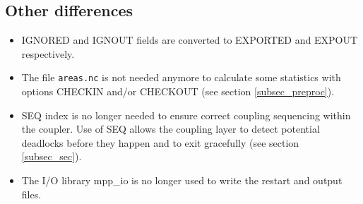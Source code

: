 \subsection{Other differences}
\label{sec_changes_other}

\begin{itemize}

\item IGNORED and IGNOUT fields are converted to EXPORTED and EXPOUT
  respectively.

\item The file {\tt areas.nc} is not needed anymore to calculate some
  statistics with options CHECKIN and/or CHECKOUT (see section \ref{subsec_preproc}).

\item SEQ index is no longer needed to ensure correct coupling
  sequencing within the coupler. Use of SEQ allows the coupling layer
  to detect potential deadlocks before they happen and to exit
  gracefully (see section \ref{subsec_sec}).

\item The I/O library mpp\_io is no longer used to write the restart and output files.


\end{itemize}
